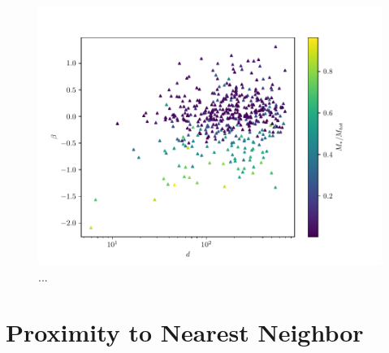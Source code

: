 \begin{figure}
    \centering
    \includegraphics*[width=\textwidth*2/3]{figs/me/beta-d.pdf}
    \caption{
        ...
    }
    \label{fig:beta-d}
\end{figure}


\section{Proximity to Nearest Neighbor}

